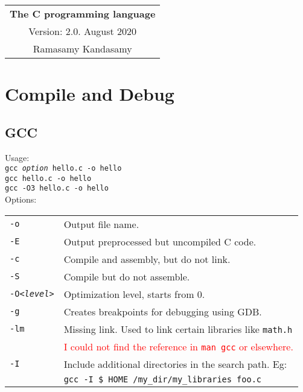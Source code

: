 




\raggedright
\footnotesize
\begin{multicols*}{3}
\setlength{\premulticols}{1pt}
\setlength{\postmulticols}{1pt}
\setlength{\multicolsep}{1pt}
\setlength{\columnsep}{2pt}



\begin{center}
\begin{tabular}{c}
\Large{\textbf{The C programming language}}\\
Version: 2.0. August 2020\\
Ramasamy Kandasamy\\
\end{tabular}
\end{center}

\section{Compile and Debug}

\subsection{GCC}
Usage:\\
\texttt{gcc \textit{option} hello.c -o hello}\\
\texttt{gcc hello.c -o hello}\\
\texttt{gcc -O3 hello.c -o hello}\\
Options:\\
\begin{tabularx}{\linewidth}{lX}
\texttt{-o} & Output file name.\\
\texttt{-E} & Output preprocessed but uncompiled C code.\\
\texttt{-c} & Compile and assembly, but do not link.\\
\texttt{-S} & Compile but do not assemble.\\
\texttt{-O\textit{<level>}} & Optimization level, starts from 0.\\
\texttt{-g} & Creates breakpoints for debugging using GDB.\\
\texttt{-lm} & Missing link. Used to link certain libraries like \texttt{math.h}\\
& \textcolor{red}{I could not find the reference in \texttt{man gcc} or elsewhere.}\\
\texttt{-I} & Include additional directories in the search path. Eg:\\
& \texttt{gcc -I \$ HOME /my\_dir/my\_libraries foo.c}\\
\end{tabularx}


\end{multicols*}

